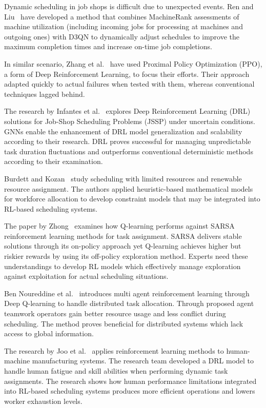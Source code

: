 \documentclass[%
aip,
cp,  %
reprint
]{revtex4-2}
\begin{document}
	Dynamic scheduling in job shops is difficult due to unexpected events. Ren and Liu~\cite{li2024} have developed a method that combines MachineRank assessments of machine utilization (including incoming jobs for processing at machines and outgoing ones) with D3QN to dynamically adjust schedules to improve the maximum completion times and increase on-time job completions.
	
	In similar scenario, Zhang et al.~\cite{zhang2022} have used Proximal Policy Optimization (PPO), a form of Deep Reinforcement Learning, to focus their efforts. Their approach adapted quickly to actual failures when tested with them, whereas conventional techniques lagged behind.
	
	The research by Infantes et al.~\cite{infantes2024} explores Deep
	Reinforcement Learning (DRL) solutions for Job-Shop Scheduling Problems (JSSP)
	under uncertain conditions. GNNs enable the enhancement of DRL model generalization
	and scalability according to their research. DRL proves successful for
	managing unpredictable task duration fluctuations and outperforms conventional
	deterministic methods according to their examination.
	
	Burdett and Kozan~\cite{burdett2004} study scheduling with limited resources
	and renewable resource assignment. The authors applied heuristic-based mathematical
	models for workforce allocation to develop constraint models that may be integrated
	into RL-based scheduling systems.
	
	The paper by Zhong~\cite{zhong2024} examines how Q-learning performs against SARSA
	reinforcement learning methods for task assignment. SARSA delivers stable
	solutions through its on-policy approach yet Q-learning achieves higher but
	riskier rewards by using its off-policy exploration method. Experts need these
	understandings to develop RL models which effectively manage exploration against
	exploitation for actual scheduling situations.
	
	Ben Noureddine et al.~\cite{noureddine2017} introduces multi agent
	reinforcement learning through Deep Q-learning to handle distributed task
	allocation. Through proposed agent teamwork operators gain better resource usage
	and less conflict during scheduling. The method proves beneficial for
	distributed systems which lack access to global information.
	
	The research by Joo et al.~\cite{joo2022} applies reinforcement learning methods
	to human-machine manufacturing systems. The research team developed a DRL
	model to handle human fatigue and skill abilities when performing dynamic task
	assignments. The research shows how human performance limitations integrated into
	RL-based scheduling systems produces more efficient operations and lowers worker
	exhaustion levels.
	
\end{document}
